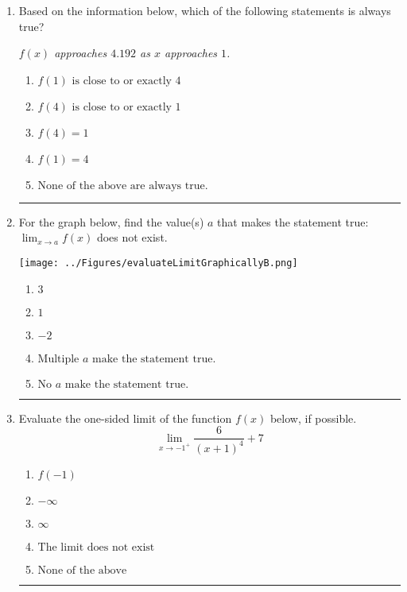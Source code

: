 \documentclass[14pt]{extbook}
\newcommand{\litem}[1]{\item#1\hspace*{-1cm}\rule{\textwidth}{0.4pt}}
\begin{document}
\begin{enumerate}
{\begin{enumerate}[label=\Alph*.]
\end{enumerate} }
\litem{
Based on the information below, which of the following statements is always true?
\begin{center}
    \textit{ $f(x)$ approaches $4.192$ as $x$ approaches $1$. }
\end{center}
\begin{enumerate}[label=\Alph*.]
\item \( f(1) \text{ is close to or exactly } 4 \)
\item \( f(4) \text{ is close to or exactly } 1 \)
\item \( f(4) = 1 \)
\item \( f(1) = 4 \)
\item \( \text{None of the above are always true.} \)

\end{enumerate} }
\litem{
For the graph below, find the value(s) $a$ that makes the statement true: $ \displaystyle \lim_{x \rightarrow a} f(x)$ does not exist.
\begin{center}
    \texttt{[image: ../Figures/evaluateLimitGraphicallyB.png]}
\end{center}
\begin{enumerate}[label=\Alph*.]
\item \( 3 \)
\item \( 1 \)
\item \( -2 \)
\item \( \text{Multiple } a \text{ make the statement true}. \)
\item \( \text{No } a \text{ make the statement true}. \)

\end{enumerate} }
\litem{
Evaluate the one-sided limit of the function $f(x)$ below, if possible.\[ \lim_{x \rightarrow -1^+} \frac{6}{(x+1)^4}+7 \]\begin{enumerate}[label=\Alph*.]
\item \( f(-1) \)
\item \( -\infty \)
\item \( \infty \)
\item \( \text{The limit does not exist} \)
\item \( \text{None of the above} \)


\end{enumerate}}
\end{enumerate}
\end{document}
